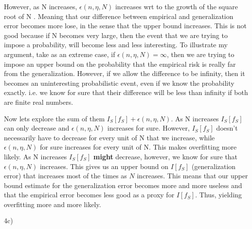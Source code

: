 \documentclass[12pt]{report}
\begin{document}
However, as N increases, $\epsilon(n, \eta, N)$ increases wrt to the growth of  the square root of N . Meaning that our difference between empirical and generalization error becomes more lose, in the sense that the upper bound increases. This is not good because if N becomes very large, then the event that we are trying to impose a probability, will become less and less interesting. To illustrate my argument, take as an extreme case, if $\epsilon(n, \eta, N) = \infty$, then we are trying to impose an upper bound on the probability that the empirical risk is really far from the generalization. However, if we allow the difference to be infinity, then it becomes an uninteresting probabilistic event, even if we know the probability exactly. i.e. we know for sure that their difference will be less than infinity if both are finite real numbers.

Now lets explore the sum of them $I_S[f_S] + \epsilon(n, \eta, N)$. As N increases $I_S[f_S]$ can only decrease and $\epsilon(n, \eta, N)$ increases for sure. However, $I_S[f_S]$ doesn't necessarily have to decrease for every unit of N that we increase, while $\epsilon(n, \eta, N)$ for sure increases for every unit of N. This makes overfitting more likely. As N increases $I_S[f_S]$ \textbf{might} decrease, however, we know for sure that $\epsilon(n, \eta, N)$ increases. This gives us an upper bound on $I[f_S]$ (generalization error) that increases most of the times as $N$ increases. This means that our upper bound estimate for the generalization error becomes more and more useless and that the empirical error becomes less good as a proxy for $I[f_S]$. Thus, yielding overfitting more and more likely.

4c)
\end{document}
